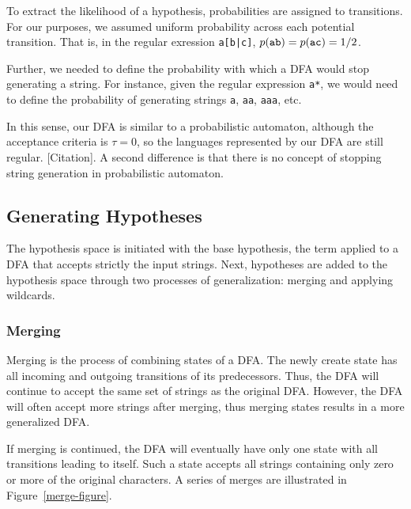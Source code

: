 \documentclass[10pt,letterpaper]{article}
\begin{document}
To extract the likelihood of a hypothesis, probabilities are assigned to transitions. For our purposes, we assumed uniform probability across each potential transition. That is, in the regular exression \verb!a[b|c]!, $p(\verb!ab!)=p(\verb!ac!)=1/2$.

Further, we needed to define the probability with which a DFA would stop generating a string. For instance, given the regular expression \verb!a*!, we would need to define the probability of generating strings \verb!a!, \verb!aa!, \verb!aaa!, etc.

In this sense, our DFA is similar to a probabilistic automaton, although the acceptance criteria is $\tau=0$, so the languages represented by our DFA are still regular. [Citation]. A second difference is that there is no concept of stopping string generation in probabilistic automaton.


\subsection{Generating Hypotheses}
The hypothesis space is initiated with the base hypothesis, the term applied to a DFA that accepts strictly the input strings. Next, hypotheses are added to the hypothesis space through two processes of generalization: merging and applying wildcards.

\subsubsection{Merging} Merging is the process of combining states of a DFA. The newly create state has all incoming and outgoing transitions of its predecessors. Thus, the DFA will continue to accept the same set of strings as the original DFA. However, the DFA will often accept more strings after merging, thus merging states results in a more generalized DFA.

If merging is continued, the DFA will eventually have only one state with all transitions leading to itself. Such a state accepts all strings containing only zero or more of the original characters. A series of merges are illustrated in Figure~\ref{merge-figure}.
\end{document}
